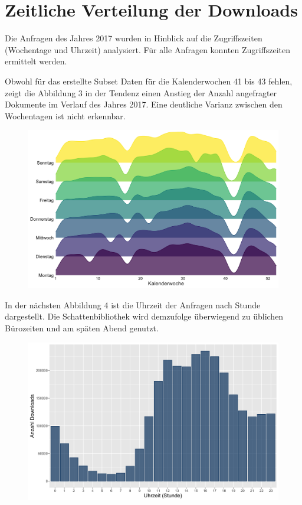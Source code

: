 \documentclass[a4paper,
fontsize=11pt,
oneside,
numbers=noperiodatend,
parskip=half-,
bibliography=totoc,
final
]{scrartcl}
\begin{document}
\hypertarget{zeitliche-verteilung-der-downloads}{%
\section{Zeitliche Verteilung der
Downloads}\label{zeitliche-verteilung-der-downloads}}

Die Anfragen des Jahres 2017 wurden in Hinblick auf die Zugriffszeiten
(Wochentage und Uhrzeit) analysiert. Für alle Anfragen konnten
Zugriffszeiten ermittelt werden.

Obwohl für das erstellte Subset Daten für die Kalenderwochen 41 bis 43
fehlen, zeigt die Abbildung 3 in der Tendenz einen Anstieg der Anzahl
angefragter Dokumente im Verlauf des Jahres 2017. Eine deutliche Varianz
zwischen den Wochentagen ist nicht erkennbar.

\begin{figure}
\centering
\includegraphics{images/Downloads_Wochentage.png}
\end{figure}

In der nächsten Abbildung 4 ist die Uhrzeit der Anfragen nach Stunde
dargestellt. Die Schattenbibliothek wird demzufolge überwiegend zu
üblichen Bürozeiten und am späten Abend genutzt.

\begin{figure}
\centering
\includegraphics{images/Downloads_Uhrzeit.png}
\end{figure}
\end{document}

